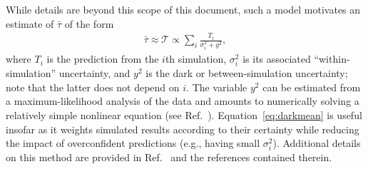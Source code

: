 While details are beyond this scope of this document, such a model motivates an estimate of $\bar \tau$ of the form
\begin{align}
\bar \tau \approx \mathcal T \propto \sum_i \frac{T_i}{\sigma_i^2 + y^2}, \label{eq:darkmean}
\end{align}
where $T_i$ is the prediction from the $i$th simulation, $\sigma_i^2$ is its associated ``within-simulation'' uncertainty, and $y^2$ is the dark or between-simulation uncertainty; note that the latter does not depend on $i$.  The variable $y^2$ can be estimated from a maximum-likelihood analysis of the data and amounts to numerically solving a relatively simple nonlinear equation (see Ref.~\cite{patrone1}).  Equation~\eqref{eq:darkmean} is useful insofar as it weights simulated results according to their certainty while reducing the impact of overconfident predictions (e.g., having small $\sigma_i^2$).  Additional details on this method are provided in Ref.~\cite{patrone1} and the references contained therein.
